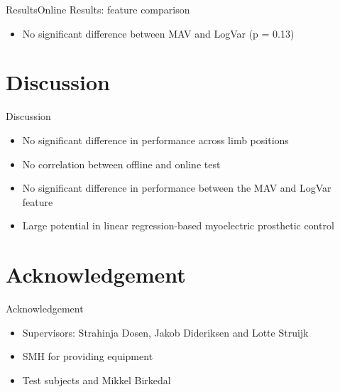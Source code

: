 \documentclass[10pt]{beamer}
\begin{document}
\begin{frame}{Results}{Online Results: feature comparison}
\begin{itemize}
	\item No significant difference between MAV and LogVar (p = 0.13)
\end{itemize}
\end{frame}



\section{Discussion}
\begin{frame}{Discussion}
\begin{itemize}
	\item<1-> No significant difference in performance across limb positions
	\item<2-> No correlation between offline and online test
	\item<3-> No significant difference in performance between the MAV and LogVar feature
	\item<4-> Large potential in linear regression-based myoelectric prosthetic control
\end{itemize}

\end{frame}




\section{Acknowledgement}
\begin{frame}{Acknowledgement}
\begin{itemize}
	\item Supervisors: Strahinja Dosen, Jakob Dideriksen and Lotte Struijk
	\item SMH for providing equipment
	\item Test subjects and Mikkel Birkedal
\end{itemize}

\end{frame}


{\aauwavesbg
\begin{frame}
\end{frame}}
\end{document}
